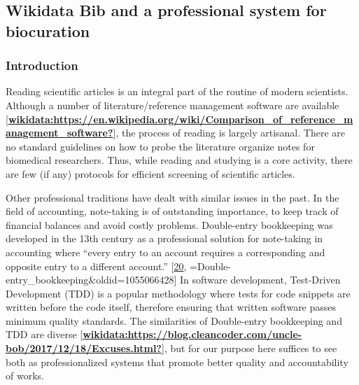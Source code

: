 \hypertarget{wikidata-bib-and-a-professional-system-for-biocuration}{%
\subsection{Wikidata Bib and a professional system for biocuration}\label{wikidata-bib-and-a-professional-system-for-biocuration}}

\hypertarget{introduction-1}{%
\subsubsection{Introduction}\label{introduction-1}}

Reading scientific articles is an integral part of the routine of modern scientists.
Although a number of literature/reference management software are available {[}\protect\hyperlink{ref-wikidata:https:ux2fux2fen.wikipedia.orgux2fwikiux2fComparison_of_reference_management_software}{\textbf{wikidata:https://en.wikipedia.org/wiki/Comparison\_of\_reference\_management\_software?}}{]}, the process of reading is largely artisanal.
There are no standard guidelines on how to probe the literature organize notes for biomedical researchers.
Thus, while reading and studying is a core activity, there are few (if any) protocols for efficient screening of scientific articles.

Other professional traditions have dealt with similar issues in the past.
In the field of accounting, note-taking is of outstanding importance, to keep track of financial balances and avoid costly problems.
Double-entry bookkeeping was developed in the 13th century as a professional solution for note-taking in accounting where ``every entry to an account requires a corresponding and opposite entry to a different account.'' {[}\protect\hyperlink{ref-uYuz0opI}{20}, =Double-entry\_bookkeeping\&oldid=1055066428{]}
In software development, Test-Driven Development (TDD) is a popular methodology where tests for code snippets are written before the code itself, therefore ensuring that written software passes minimum quality standards.
The similarities of Double-entry bookkeeping and TDD are diverse {[}\protect\hyperlink{ref-wikidata:https:ux2fux2fblog.cleancoder.comux2funcle-bobux2f2017ux2f12ux2f18ux2fExcuses.html}{\textbf{wikidata:https://blog.cleancoder.com/uncle-bob/2017/12/18/Excuses.html?}}{]}, but for our purpose here suffices to see both as professionalized systems that promote better quality and accountability of works.

